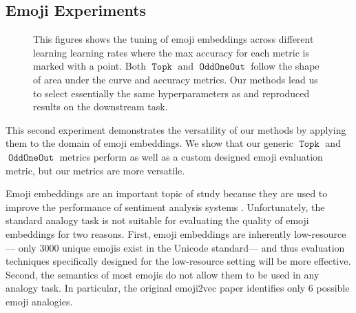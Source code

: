\documentclass[11pt,a4paper]{article}
\DeclareMathOperator{\OddOneOut}{\texttt{OddOneOut}}
\DeclareMathOperator{\topk}{\texttt{Topk}}
\begin{document}
\subsection{Emoji Experiments}
\begin{figure}
\centering
\caption{This figures shows the tuning of emoji embeddings across different learning learning rates where the max accuracy for each metric is marked with a point.
 Both $\topk$ and $\OddOneOut$ follow the shape of \cite{eisner2016emoji2vec} area under the curve and accuracy metrics.
 Our methods lead us to select essentially the same hyperparameters as \cite{eisner2016emoji2vec} and reproduced results on the downstream task.}
\label{fig:emoji}
\end{figure}

This second experiment demonstrates the versatility of our methods by applying them to the domain of emoji embeddings.
We show that our generic $\topk$ and $\OddOneOut$ metrics perform as well as a custom designed emoji evaluation metric,
but our metrics are more versatile.

Emoji embeddings are an important topic of study because they are used to improve the performance of sentiment analysis systems \cite[e.g.][]{eisner2016emoji2vec,felbo2017using,barbieri2017emojis,ai2017untangling,wijeratne2017semantics,al2019smile}. 
Unfortunately,
the standard analogy task is not suitable for evaluating the quality of emoji embeddings for two reasons.
First, emoji embeddings are inherently low-resource---%
only 3000 unique emojis exist in the Unicode standard---%
and thus evaluation techniques specifically designed for the low-resource setting will be more effective.
Second, the semantics of most emojis do not allow them to be used in any analogy task.
In particular, the original emoji2vec paper \cite{eisner2016emoji2vec} identifies only 6 possible emoji analogies.
\end{document}
